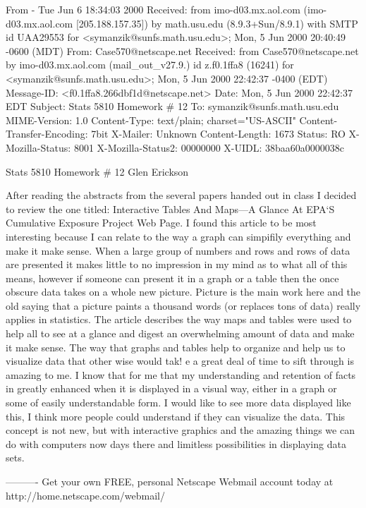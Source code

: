 From - Tue Jun  6 18:34:03 2000
Received: from imo-d03.mx.aol.com (imo-d03.mx.aol.com [205.188.157.35])
	by math.usu.edu (8.9.3+Sun/8.9.1) with SMTP id UAA29553
	for <symanzik@sunfs.math.usu.edu>; Mon, 5 Jun 2000 20:40:49 -0600 (MDT)
From: Case570@netscape.net
Received: from Case570@netscape.net
	by imo-d03.mx.aol.com (mail_out_v27.9.) id z.f0.1ffa8 (16241)
	 for <symanzik@sunfs.math.usu.edu>; Mon, 5 Jun 2000 22:42:37 -0400 (EDT)
Message-ID: <f0.1ffa8.266dbf1d@netscape.net>
Date: Mon, 5 Jun 2000 22:42:37 EDT
Subject:  Stats 5810 Homework # 12
To: symanzik@sunfs.math.usu.edu
MIME-Version: 1.0
Content-Type: text/plain; charset="US-ASCII"
Content-Transfer-Encoding: 7bit
X-Mailer: Unknown
Content-Length: 1673
Status: RO
X-Mozilla-Status: 8001
X-Mozilla-Status2: 00000000
X-UIDL: 38baa60a0000038c

Stats 5810
Homework # 12
Glen Erickson

     After reading the abstracts from the several papers handed out in class I decided to review the one titled:  Interactive Tables And Maps---A Glance At EPA`S Cumulative Exposure Project Web Page. I found this article to be most interesting because I can relate to the way a graph can simpifily everything and make it make sense. When a large group of numbers and rows and rows of data are presented it makes little to no impression in my mind as to what all of this means, however if someone can present it in a graph or a table then the once obscure data takes on a whole new picture. Picture is the main work here and the old saying that a picture paints a thousand words (or replaces tons of data) really applies in statistics. The article describes the way maps and tables were used to help all to see at a glance and digest an overwhelming amount of data and make it make sense. The way that graphs and tables help to organize and help us to visualize data that other wise would tak!
e a great deal of time to sift through is amazing to me. I know that for me that my understanding and retention of facts in greatly enhanced when it is displayed in a visual way, either in a graph or some of easily understandable form.
     I would like to see more data displayed like this, I think more people could understand if they can visualize the data. This concept is not new, but with interactive graphics and the amazing things we can do with computers now days there and limitless possibilities in displaying data sets.

----------
Get your own FREE, personal Netscape Webmail account today at http://home.netscape.com/webmail/
